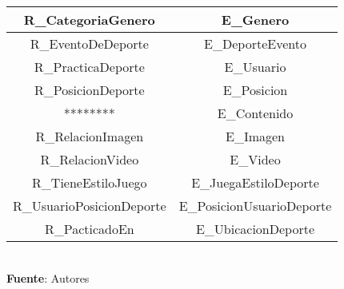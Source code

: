 \begin{table}[!htb]
\begin{center}
{\begin{tabular}{|p{4cm}|p{4cm}|p{4cm}|p{4cm}|}
			\hline
			\multicolumn{2}{|c|}{R_CategoriaGenero} & 
			\multicolumn{2}{c|}{E_Genero} \\
			\hline
			\multicolumn{2}{|c|}{R_EventoDeDeporte} & 
			\multicolumn{2}{c|}{E_DeporteEvento} \\
			\hline
			\multicolumn{2}{|c|}{R_PracticaDeporte} & 
			\multicolumn{2}{c|}{E_Usuario} \\
			\hline
			\multicolumn{2}{|c|}{R_PosicionDeporte} & 
			\multicolumn{2}{c|}{E_Posicion} \\
			\hline
			\multicolumn{2}{|c|}{********} & 
			\multicolumn{2}{c|}{E_Contenido} \\
			\hline
			\multicolumn{2}{|c|}{R_RelacionImagen} & 
			\multicolumn{2}{c|}{E_Imagen} \\
			\hline
			\multicolumn{2}{|c|}{R_RelacionVideo} & 
			\multicolumn{2}{c|}{E_Video} \\
			\hline
			\multicolumn{2}{|c|}{R_TieneEstiloJuego} & 
			\multicolumn{2}{c|}{E_JuegaEstiloDeporte} \\
			\hline
			\multicolumn{2}{|c|}{R_UsuarioPosicionDeporte} & 
			\multicolumn{2}{c|}{E_PosicionUsuarioDeporte} \\
			\hline
			\multicolumn{2}{|c|}{R_PacticadoEn} & 
			\multicolumn{2}{c|}{E_UbicacionDeporte} \\
			\hline
		\end{tabular}
		} \\
		\textbf{Fuente}: Autores
	\end{center}
\end{table}